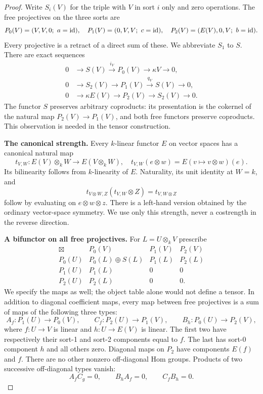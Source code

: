 \begin{proof}
Write $S_i(V)$ for the triple with $V$ in sort $i$ only and zero operations. The free projectives on the three sorts are
\[
P_0(V)=(V,V,0;\ a=\operatorname{id}),\quad
P_1(V)=(0,V,V;\ c=\operatorname{id}),\quad
P_2(V)=(E(V),0,V;\ b=\operatorname{id}).
\]
Every projective is a retract of a direct sum of these. We abbreviate $S_1$ to $S$. There are exact sequences
\begin{align*}
0&\longrightarrow S(V)\xrightarrow{i_V}P_0(V)\longrightarrow\kappa V\longrightarrow0,\\
0&\longrightarrow S_2(V)\longrightarrow P_1(V)\xrightarrow{q_V}S(V)\longrightarrow0,\\
0&\longrightarrow\kappa E(V)\longrightarrow P_2(V)\longrightarrow S_2(V)\longrightarrow0.
\end{align*}
The functor $S$ preserves arbitrary coproducts: its presentation is the cokernel of the natural map $P_2(V)\to P_1(V)$, and both free functors preserve coproducts. This observation is needed in the tensor construction.

\textbf{The canonical strength.}
Every $k$-linear functor $E$ on vector spaces has a canonical natural map
\[
t_{V,W}:E(V)\otimes_k W\longrightarrow E(V\otimes_k W),
\quad t_{V,W}(e\otimes w)=E(v\mapsto v\otimes w)(e).
\]
Its bilinearity follows from $k$-linearity of $E$. Naturality, its unit identity at $W=k$, and
\[
t_{V\otimes W,Z}(t_{V,W}\otimes Z)=t_{V,W\otimes Z}
\]
follow by evaluating on $e\otimes w\otimes z$. There is a left-hand version obtained by the ordinary vector-space symmetry. We use only this strength, never a costrength in the reverse direction.

\textbf{A bifunctor on all free projectives.}
For $L=U\otimes_k V$ prescribe
\[
\begin{array}{c|ccc}
\boxtimes&P_0(V)&P_1(V)&P_2(V)\\ \hline
P_0(U)&P_0(L)\oplus S(L)&P_1(L)&P_2(L)\\
P_1(U)&P_1(L)&0&0\\
P_2(U)&P_2(L)&0&0.
\end{array}
\]
We specify the maps as well; the object table alone would not define a tensor. In addition to diagonal coefficient maps, every map between free projectives is a sum of maps of the following three types:
\[
A_f:P_1(U)\to P_0(V),\qquad
C_f:P_2(U)\to P_1(V),\qquad
B_h:P_0(U)\to P_2(V),
\]
where $f:U\to V$ is linear and $h:U\to E(V)$ is linear. The first two have respectively their sort-1 and sort-2 components equal to $f$. The last has sort-0 component $h$ and all others zero. Diagonal maps on $P_2$ have components $E(f)$ and $f$. There are no other nonzero off-diagonal Hom groups. Products of two successive off-diagonal types vanish:
\[
A_f C_g=0,\qquad B_h A_f=0,\qquad C_f B_h=0.
\]


\end{proof}
